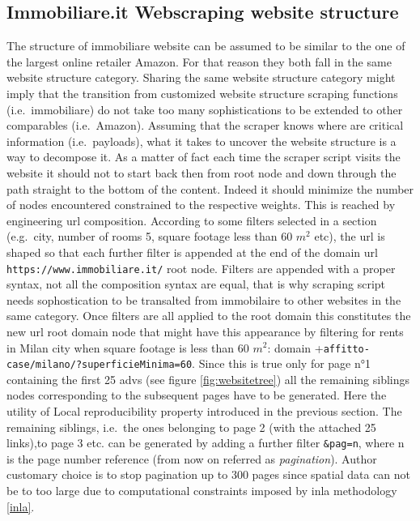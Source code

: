 \documentclass[
  12pt,
  a4paper,
  oneside]{book}
\theoremstyle{definition}
\theoremstyle{definition}
\theoremstyle{definition}
\theoremstyle{remark}
\begin{document}
\hypertarget{webstructure}{%
\subsection{Immobiliare.it Webscraping website structure}\label{webstructure}}

The structure of immobiliare website can be assumed to be similar to the one of the largest online retailer Amazon. For that reason they both fall in the same website structure category. Sharing the same website structure category might imply that the transition from customized website structure scraping functions (i.e.~immobiliare) do not take too many sophistications to be extended to other comparables (i.e.~Amazon). Assuming that the scraper knows where are critical information (i.e.~payloads), what it takes to uncover the website structure is a way to decompose it. As a matter of fact each time the scraper script visits the website it should not to start back then from root node and down through the path straight to the bottom of the content. Indeed it should minimize the number of nodes encountered constrained to the respective weights. This is reached by engineering url composition.
According to some filters selected in a section (e.g.~city, number of rooms 5, square footage less than 60 \(m^2\) etc), the url is shaped so that each further filter is appended at the end of the domain url \texttt{https://www.immobiliare.it/} root node. Filters are appended with a proper syntax, not all the composition syntax are equal, that is why scraping script needs sophostication to be transalted from immobilaire to other websites in the same category. Once filters are all applied to the root domain this constitutes the new url root domain node that might have this appearance by filtering for rents in Milan city when square footage is less than 60 \(m^2\): domain +\texttt{affitto-case/milano/?superficieMinima=60}. Since this is true only for page n°1 containing the first 25 advs (see figure \ref{fig:websitetree}) all the remaining siblings nodes corresponding to the subsequent pages have to be generated. Here the utility of Local reproducibility property introduced in the previous section. The remaining siblings, i.e.~the ones belonging to page 2 (with the attached 25 links),to page 3 etc. can be generated by adding a further filter \texttt{\&pag=n}, where n is the page number reference (from now on referred as \emph{pagination}). Author customary choice is to stop pagination up to 300 pages since spatial data can not be to too large due to computational constraints imposed by inla methodology \ref{inla}.
\end{document}
